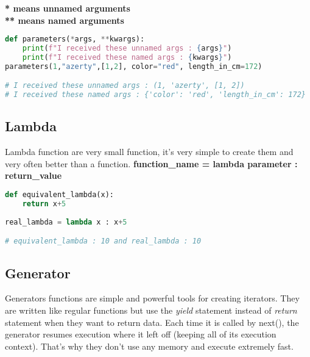 \documentclass[a4paper, 12pt, titlepage]{scrartcl} %
\begin{document}
\textbf{* means unnamed arguments \\ ** means named arguments}
\begin{lstlisting}[language=Python]
def parameters(*args, **kwargs):
	print(f"I received these unnamed args : {args}")
	print(f"I received these named args : {kwargs}")
parameters(1,"azerty",[1,2], color="red", length_in_cm=172)

# I received these unnamed args : (1, 'azerty', [1, 2])
# I received these named args : {'color': 'red', 'length_in_cm': 172}
\end{lstlisting} \vspace{5mm}

\subsection{Lambda}
\label{subsec:Lambda}
Lambda function are very small function, it's very simple to create them and very often better than a function. \textbf{function\_name = lambda parameter : return\_value}
\begin{lstlisting}[language=Python]
def equivalent_lambda(x):
	return x+5
	
real_lambda = lambda x : x+5

# equivalent_lambda : 10 and real_lambda : 10
\end{lstlisting} \vspace{5mm}

\subsection{Generator}
\label{subsec:Generators}
Generators functions are simple and powerful tools for creating iterators. They are written like regular functions but use the \textit{yield} statement instead of \textit{return} statement when they want to return data. Each time it is called by next(), the generator resumes execution where it left off (keeping all of its execution context). That's why they don't use any memory and execute extremely fast.

\vspace{5mm}
\end{document}
